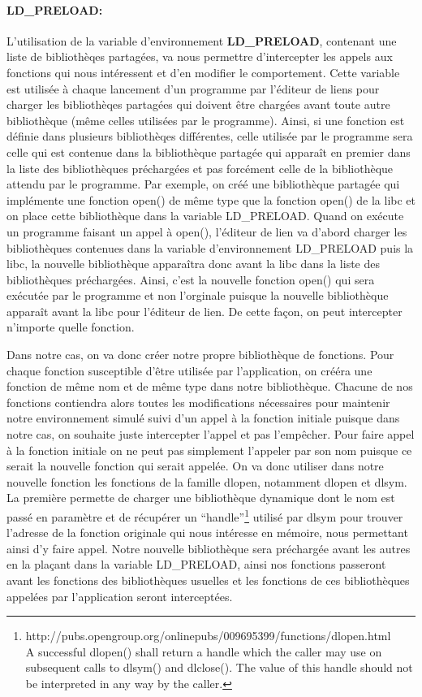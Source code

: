 \paragraph{LD\_PRELOAD:}
L'utilisation de la variable d'environnement
\textbf{LD\_PRELOAD}\cite{INTERCEPTION:LD_PRELOAD}, contenant une liste de
bibliothèqes partagées, va nous permettre d'intercepter les appels aux fonctions
qui nous intéressent et d'en modifier le comportement. Cette variable est
utilisée à chaque lancement d'un programme par l'éditeur de liens pour charger
les bibliothèqes partagées qui doivent être chargées avant toute autre
bibliothèque (même celles utilisées par le programme). Ainsi, si une fonction
est définie dans plusieurs bibliothèqes différentes, celle utilisée par le
programme sera celle qui est contenue dans la bibliothèque partagée qui apparaît
en premier dans la liste des bibliothèques préchargées et pas forcément celle de
la bibliothèque attendu par le programme. Par exemple, on créé une bibliothèque
partagée qui implémente une fonction open() de même type que la fonction open()
de la libc et on place cette bibliothèque dans la variable LD\_PRELOAD. Quand on
exécute un programme faisant un appel à open(), l'éditeur de lien va d'abord
charger les bibliothèques contenues dans la variable d'environnement LD\_PRELOAD
puis la libc, la nouvelle bibliothèque apparaîtra donc avant la libc dans la
liste des bibliothèques préchargées. Ainsi, c'est la nouvelle fonction open()
qui sera exécutée par le programme et non l'orginale puisque la nouvelle
bibliothèque apparaît avant la libc pour l'éditeur de lien. De cette façon, on
peut intercepter n'importe quelle fonction.

Dans notre cas, on va donc créer notre propre bibliothèque de fonctions. Pour
chaque fonction susceptible d'être utilisée par l'application, on crééra une
fonction de même nom et de même type dans notre bibliothèque. Chacune de nos
fonctions contiendra alors toutes les modifications nécessaires pour maintenir
notre environnement simulé suivi d'un appel à la fonction initiale puisque dans
notre cas, on souhaite juste intercepter l'appel et pas l'empêcher. Pour faire
appel à la fonction initiale on ne peut pas simplement l'appeler par son nom
puisque ce serait la nouvelle fonction qui serait appelée. On va donc utiliser
dans notre nouvelle fonction les fonctions de la famille dlopen, notamment
dlopen et dlsym. La première permette de charger une bibliothèque dynamique dont
le nom est passé en paramètre et de récupérer un
``handle''\footnote{http://pubs.opengroup.org/onlinepubs/009695399/functions/dlopen.html
  \\ A successful dlopen() shall return a handle which the caller may use on
  subsequent calls to dlsym() and dlclose(). The value of this handle should not
  be interpreted in any way by the caller.} utilisé par dlsym pour trouver
l'adresse de la fonction originale qui nous intéresse en mémoire, nous
permettant ainsi d'y faire appel. Notre nouvelle bibliothèque sera préchargée
avant les autres en la plaçant dans la variable LD\_PRELOAD, ainsi nos fonctions
passeront avant les fonctions des bibliothèques usuelles et les fonctions de ces
bibliothèques appelées par l'application seront interceptées.

